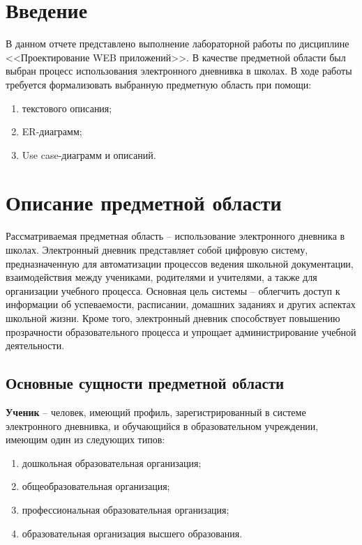 \documentclass[a4paper, final]{article}
\begin{document}
\newpage

\tableofcontents

\newpage

\cleardoublepage
{}

\section*{Введение}
В данном отчете представлено выполнение лабораторной работы по дисциплине <<Проектирование WEB приложений>>. В качестве предметной области был выбран процесс использования электронного дневнивка в школах.
В ходе работы требуется формализовать выбранную предметную область при помощи:
\begin{enumerate}
    \item текстового описания;
    \item ER-диаграмм;
    \item Use case-диаграмм и описаний.
\end{enumerate}

\newpage
\section{Описание предметной области}

Рассматриваемая предметная область -- использование электронного дневника в школах. Электронный дневник представляет собой цифровую систему, предназначенную для автоматизации процессов ведения школьной документации, взаимодействия между учениками, родителями и учителями, а также для организации учебного процесса. Основная цель системы -- облегчить доступ к информации об успеваемости, расписании, домашних заданиях и других аспектах школьной жизни. Кроме того, электронный дневник способствует повышению прозрачности образовательного процесса и упрощает администрирование учебной деятельности.

\subsection{Основные сущности предметной области}

\textbf{Ученик} -- человек, имеющий профиль, зарегистрированный в системе электронного дневнивка, и обучающийся в образовательном учреждении, имеющим один из следующих типов:
\begin{enumerate}
  \item дошкольная образовательная организация;
  \item общеобразовательная организация;
  \item профессиональная образовательная организация;
  \item образовательная организация высшего образования.
\end{enumerate}
\end{document}
